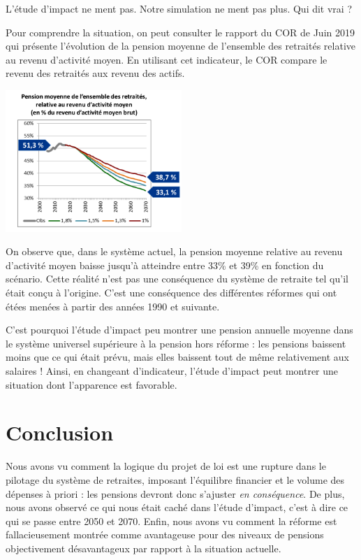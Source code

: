 \documentclass[10pt]{article}
\begin{document}
L'étude d'impact ne ment pas. 
Notre simulation ne ment pas plus. 
Qui dit vrai ?

Pour comprendre la situation, on peut consulter le rapport du COR de Juin 2019 qui 
présente l'évolution de la pension moyenne de l'ensemble des retraités relative 
au revenu d'activité moyen. 
En utilisant cet indicateur, le COR compare le revenu des retraités aux revenu des 
actifs. 

\begin{center}
\includegraphics[width=0.5\textwidth]{COR-Juin-2019-P.png}
\end{center}

On observe que, dans le système actuel, la pension moyenne relative au revenu d'activité 
moyen baisse jusqu'à atteindre entre 33\% et 39\% en fonction du scénario. 
Cette réalité n'est pas une conséquence du système de retraite tel qu'il était conçu 
à l'origine. 
C'est une conséquence des différentes réformes qui ont étées menées 
à partir des années 1990 et suivante. 

C'est pourquoi l'étude d'impact peu montrer une pension annuelle moyenne 
dans le système universel supérieure à la pension hors réforme : 
les pensions baissent moins que ce qui était prévu, mais elles baissent 
tout de même relativement aux salaires ! 
Ainsi, en changeant d'indicateur, l'étude d'impact peut montrer une situation 
dont l'apparence est favorable. 


\section{Conclusion}

Nous avons vu comment la logique du projet de loi est une 
rupture dans le pilotage du système de retraites, 
imposant l'équilibre financier et le volume des dépenses 
à priori : les pensions devront donc s'ajuster \emph{en conséquence}. 
De plus, nous avons observé ce qui nous était caché dans l'étude 
d'impact, c'est à dire ce qui se passe entre 2050 et 2070. 
Enfin, nous avons vu comment la réforme est fallacieusement 
montrée comme avantageuse pour des niveaux de pensions 
objectivement désavantageux par rapport à la situation 
actuelle. 
\end{document}
